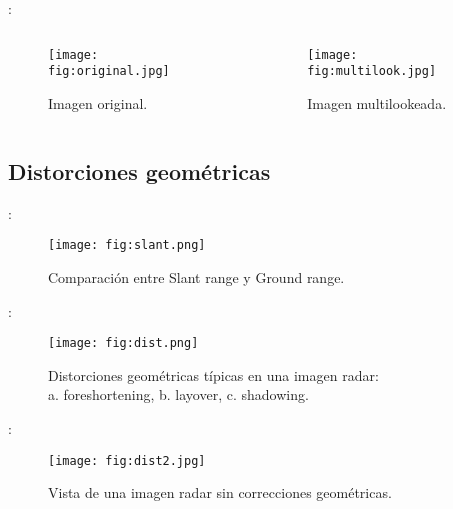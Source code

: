 \begin{frame}{\secname : \subsecname}
  \begin{columns}
  \begin{column}{0.5\textwidth}
    \begin{figure}
      \centering
      \texttt{[image: fig:original.jpg]}
      \caption{Imagen original.}
      \label{}
    \end{figure}
  \end{column}
  \begin{column}{0.5\textwidth}  %
    \begin{figure}
      \centering
      \texttt{[image: fig:multilook.jpg]}
      \caption{Imagen multilookeada.}
      \label{}
    \end{figure}
  \end{column}
  \end{columns}
\end{frame}


\subsection{Distorciones geométricas}

\begin{frame}{\secname : \subsecname}
      \begin{figure}
        \centering
        \texttt{[image: fig:slant.png]}
        \caption{Comparación entre Slant range y Ground range.}
        \label{}
      \end{figure}
\end{frame}

\begin{frame}{\secname : \subsecname}
      \begin{figure}
        \centering
        \texttt{[image: fig:dist.png]}
        \caption{Distorciones geométricas típicas en una imagen radar:\\ {\centering a. foreshortening, b. layover, c. shadowing.}}
        \label{}
      \end{figure}
\end{frame}

\begin{frame}{\secname : \subsecname}
    \begin{figure}
      \centering
      \texttt{[image: fig:dist2.jpg]}
      \caption{Vista de una imagen radar sin correcciones geométricas.}
      \label{}
    \end{figure}
\end{frame}

